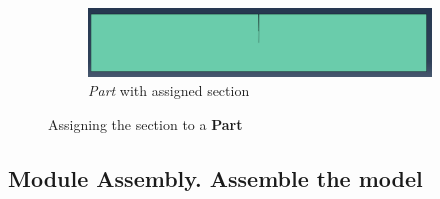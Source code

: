 \begin{figure}[!h]
    \begin{subfigure}[!h]{0.75\textwidth}
      \includegraphics[width=\textwidth]{./body/images/prop07.png}
      \caption{\textit{Part} with assigned section}
      \label{prop07}
    \end{subfigure}%
    \caption{Assigning the section to a \textbf{Part}}
  \end{figure}

  \subsection{Module Assembly. Assemble the model}

